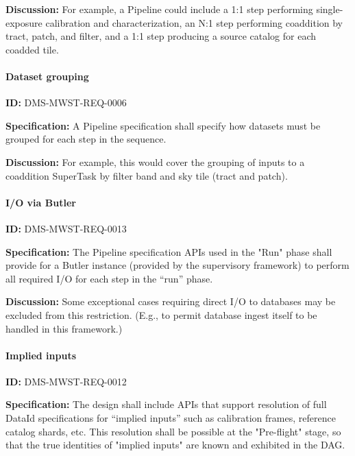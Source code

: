 \documentclass[SE,toc,lsstdraft]{lsstdoc}
\begin{document}
\textbf{Discussion:}
For example, a Pipeline could include a 1:1 step performing single-exposure calibration and characterization, an N:1 step performing coaddition by tract, patch, and filter, and a 1:1 step producing a source catalog for each coadded tile.

\paragraph{Dataset grouping}\hfill  %

\label{DMS-MWST-REQ-0006}
\textbf{ID:} DMS-MWST-REQ-0006

\textbf{Specification:}
A Pipeline specification shall specify how datasets must be grouped for each step in the sequence.

\textbf{Discussion:}
For example, this would cover the grouping of inputs to a coaddition SuperTask by filter band and sky tile (tract and patch).

\paragraph{I/O via Butler}\hfill  %

\label{DMS-MWST-REQ-0013}
\textbf{ID:} DMS-MWST-REQ-0013

\textbf{Specification:}
The Pipeline specification APIs used in the "Run" phase shall provide for a Butler instance (provided by the supervisory framework) to perform all required I/O for each step in the “run” phase.

\textbf{Discussion:}
Some exceptional cases requiring direct I/O to databases may be excluded from this restriction. (E.g., to permit database ingest itself to be handled in this framework.)

\paragraph{Implied inputs}\hfill  %

\label{DMS-MWST-REQ-0012}
\textbf{ID:} DMS-MWST-REQ-0012

\textbf{Specification:}
The design shall include APIs that support resolution of full DataId specifications for “implied inputs” such as calibration frames, reference catalog shards, etc. This resolution shall be possible at the "Pre-flight" stage, so that the true identities of "implied inputs" are known and exhibited in the DAG.
\end{document}
